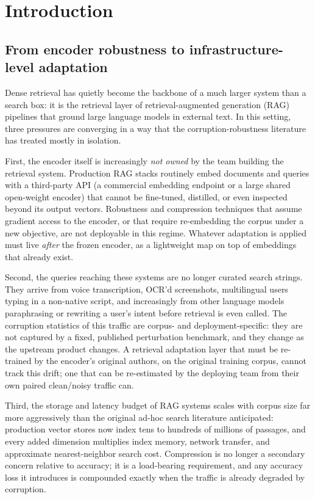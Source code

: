 \section{Introduction}
\label{sec:intro}

\subsection{From encoder robustness to infrastructure-level adaptation}

Dense retrieval has quietly become the backbone of a much larger system than
a search box: it is the retrieval layer of retrieval-augmented generation
(RAG) pipelines that ground large language models in external text. In this
setting, three pressures are converging in a way that the corruption-robustness
literature has treated mostly in isolation.

First, the encoder itself is increasingly \emph{not owned} by the team
building the retrieval system. Production RAG stacks routinely embed
documents and queries with a third-party API (a commercial embedding
endpoint or a large shared open-weight encoder) that cannot be fine-tuned,
distilled, or even inspected beyond its output vectors. Robustness and
compression techniques that assume gradient access to the encoder, or that
require re-embedding the corpus under a new objective, are not deployable in
this regime. Whatever adaptation is applied must live \emph{after} the
frozen encoder, as a lightweight map on top of embeddings that already exist.

Second, the queries reaching these systems are no longer curated search
strings. They arrive from voice transcription, OCR'd screenshots, multilingual
users typing in a non-native script, and increasingly from other language
models paraphrasing or rewriting a user's intent before retrieval is even
called. The corruption statistics of this traffic are corpus- and
deployment-specific: they are not captured by a fixed, published perturbation
benchmark, and they change as the upstream product changes. A retrieval
adaptation layer that must be re-trained by the encoder's original authors,
on the original training corpus, cannot track this drift; one that can be
re-estimated by the deploying team from their own paired clean/noisy traffic
can.

Third, the storage and latency budget of RAG systems scales with corpus size
far more aggressively than the original ad-hoc search literature anticipated:
production vector stores now index tens to hundreds of millions of
passages, and every added dimension multiplies index memory, network
transfer, and approximate nearest-neighbor search cost. Compression is no
longer a secondary concern relative to accuracy; it is a load-bearing
requirement, and any accuracy loss it introduces is compounded exactly when
the traffic is already degraded by corruption.

